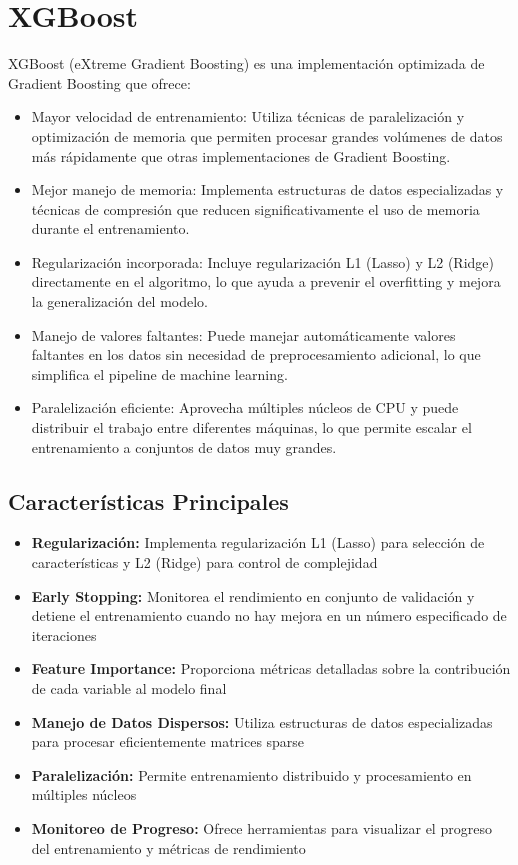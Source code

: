 \documentclass[12pt]{article}
\begin{document}
\section{XGBoost}
XGBoost (eXtreme Gradient Boosting) es una implementación optimizada de Gradient Boosting que ofrece:
\begin{itemize}
    \item Mayor velocidad de entrenamiento: Utiliza técnicas de paralelización y optimización de memoria que permiten procesar grandes volúmenes de datos más rápidamente que otras implementaciones de Gradient Boosting.
    \item Mejor manejo de memoria: Implementa estructuras de datos especializadas y técnicas de compresión que reducen significativamente el uso de memoria durante el entrenamiento.
    \item Regularización incorporada: Incluye regularización L1 (Lasso) y L2 (Ridge) directamente en el algoritmo, lo que ayuda a prevenir el overfitting y mejora la generalización del modelo.
    \item Manejo de valores faltantes: Puede manejar automáticamente valores faltantes en los datos sin necesidad de preprocesamiento adicional, lo que simplifica el pipeline de machine learning.
    \item Paralelización eficiente: Aprovecha múltiples núcleos de CPU y puede distribuir el trabajo entre diferentes máquinas, lo que permite escalar el entrenamiento a conjuntos de datos muy grandes.
\end{itemize}

\subsection{Características Principales}
\begin{itemize}
    \item \textbf{Regularización:} Implementa regularización L1 (Lasso) para selección de características y L2 (Ridge) para control de complejidad
    \item \textbf{Early Stopping:} Monitorea el rendimiento en conjunto de validación y detiene el entrenamiento cuando no hay mejora en un número especificado de iteraciones
    \item \textbf{Feature Importance:} Proporciona métricas detalladas sobre la contribución de cada variable al modelo final
    \item \textbf{Manejo de Datos Dispersos:} Utiliza estructuras de datos especializadas para procesar eficientemente matrices sparse
    \item \textbf{Paralelización:} Permite entrenamiento distribuido y procesamiento en múltiples núcleos
    \item \textbf{Monitoreo de Progreso:} Ofrece herramientas para visualizar el progreso del entrenamiento y métricas de rendimiento
\end{itemize}
\end{document}
